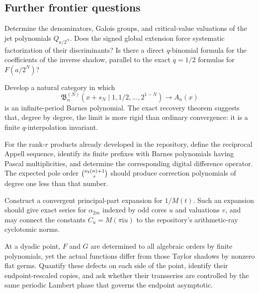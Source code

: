 \documentclass[11pt,oneside]{article}
\numberwithin{equation}{section}
\theoremstyle{definition}
\theoremstyle{remark}
\newcommand{\ii}{\mathrm i}
\begin{document}
\subsection{Further frontier questions}

\begin{frontierbox}
Determine the denominators, Galois groups, and critical-value valuations of the jet polynomials
$Q_{a/2^N}$.  Does the signed global extension force systematic factorization of their
discriminants?  Is there a direct $q$-binomial formula for the coefficients of the inverse shadow,
parallel to the exact $q=1/2$ formulas for $F(a/2^N)$?
\end{frontierbox}

\begin{frontierbox}
Develop a natural category in which
\[
 \mathfrak B_n^{(N)}(x+s_N\mid1,1/2,\ldots,2^{1-N})\longrightarrow A_n(x)
\]
is an infinite-period Barnes polynomial.  The exact recovery theorem suggests that, degree by
degree, the limit is more rigid than ordinary convergence: it is a finite $q$-interpolation invariant.
\end{frontierbox}

\begin{frontierbox}
For the rank-$r$ products already developed in the repository, define the reciprocal Appell sequence,
identify its finite prefixes with Barnes polynomials having Pascal multiplicities, and determine the
corresponding digital difference operator.  The expected pole order
$\binom{\nu_2(n)+1}{r}$ should produce correction polynomials of degree one less than that number.
\end{frontierbox}

\begin{frontierbox}
Construct a convergent principal-part expansion for $1/M(t)$.  Such an expansion should give exact
series for $\alpha_{2m}$ indexed by odd cores $u$ and valuations $v$, and may connect the constants
$C_u=M(\pi\ii u)$ to the repository's arithmetic-ray cyclotomic norms.
\end{frontierbox}

\begin{frontierbox}
At a dyadic point, $F$ and $G$ are determined to all algebraic orders by finite polynomials, yet the
actual functions differ from those Taylor shadows by nonzero flat germs.  Quantify these defects on
each side of the point, identify their endpoint-rescaled copies, and ask whether their transseries are
controlled by the same periodic Lambert phase that governs the endpoint asymptotic.
\end{frontierbox}
\end{document}
